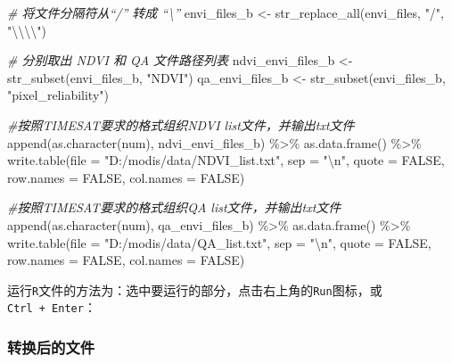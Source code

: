 \documentclass[
]{article}
\newenvironment{Shaded}{\begin{snugshade}}{\end{snugshade}}
\newcommand{\AttributeTok}[1]{\textcolor[rgb]{0.77,0.63,0.00}{#1}}
\newcommand{\CommentTok}[1]{\textcolor[rgb]{0.56,0.35,0.01}{\textit{#1}}}
\newcommand{\ConstantTok}[1]{\textcolor[rgb]{0.00,0.00,0.00}{#1}}
\newcommand{\FunctionTok}[1]{\textcolor[rgb]{0.00,0.00,0.00}{#1}}
\newcommand{\NormalTok}[1]{#1}
\newcommand{\OtherTok}[1]{\textcolor[rgb]{0.56,0.35,0.01}{#1}}
\newcommand{\SpecialCharTok}[1]{\textcolor[rgb]{0.00,0.00,0.00}{#1}}
\newcommand{\StringTok}[1]{\textcolor[rgb]{0.31,0.60,0.02}{#1}}
\begin{document}
\begin{Shaded}
\begin{Highlighting}[]
\CommentTok{\# 将文件分隔符从“/” 转成 “\textbackslash{}”}
\NormalTok{envi\_files\_b }\OtherTok{\textless{}{-}} \FunctionTok{str\_replace\_all}\NormalTok{(envi\_files, }\StringTok{"/"}\NormalTok{, }\StringTok{"}\SpecialCharTok{\textbackslash{}\textbackslash{}\textbackslash{}\textbackslash{}}\StringTok{"}\NormalTok{) }

\CommentTok{\# 分别取出 NDVI 和 QA 文件路径列表}
\NormalTok{ndvi\_envi\_files\_b }\OtherTok{\textless{}{-}} \FunctionTok{str\_subset}\NormalTok{(envi\_files\_b, }\StringTok{"NDVI"}\NormalTok{)}
\NormalTok{qa\_envi\_files\_b }\OtherTok{\textless{}{-}} \FunctionTok{str\_subset}\NormalTok{(envi\_files\_b, }\StringTok{"pixel\_reliability"}\NormalTok{)}

\CommentTok{\#按照TIMESAT要求的格式组织NDVI list文件，并输出txt文件}
\FunctionTok{append}\NormalTok{(}\FunctionTok{as.character}\NormalTok{(num), ndvi\_envi\_files\_b) }\SpecialCharTok{\%\textgreater{}\%} 
  \FunctionTok{as.data.frame}\NormalTok{() }\SpecialCharTok{\%\textgreater{}\%} 
  \FunctionTok{write.table}\NormalTok{(}\AttributeTok{file =} \StringTok{"D:/modis/data/NDVI\_list.txt"}\NormalTok{,}
            \AttributeTok{sep =} \StringTok{"}\SpecialCharTok{\textbackslash{}n}\StringTok{"}\NormalTok{, }\AttributeTok{quote =} \ConstantTok{FALSE}\NormalTok{, }
            \AttributeTok{row.names =} \ConstantTok{FALSE}\NormalTok{, }\AttributeTok{col.names =} \ConstantTok{FALSE}\NormalTok{)}

\CommentTok{\#按照TIMESAT要求的格式组织QA list文件，并输出txt文件}
\FunctionTok{append}\NormalTok{(}\FunctionTok{as.character}\NormalTok{(num), qa\_envi\_files\_b) }\SpecialCharTok{\%\textgreater{}\%} 
  \FunctionTok{as.data.frame}\NormalTok{() }\SpecialCharTok{\%\textgreater{}\%} 
  \FunctionTok{write.table}\NormalTok{(}\AttributeTok{file =} \StringTok{"D:/modis/data/QA\_list.txt"}\NormalTok{,}
              \AttributeTok{sep =} \StringTok{"}\SpecialCharTok{\textbackslash{}n}\StringTok{"}\NormalTok{, }\AttributeTok{quote =} \ConstantTok{FALSE}\NormalTok{, }
              \AttributeTok{row.names =} \ConstantTok{FALSE}\NormalTok{, }\AttributeTok{col.names =} \ConstantTok{FALSE}\NormalTok{)}
\end{Highlighting}
\end{Shaded}

运行\texttt{R}文件的方法为：选中要运行的部分，点击右上角的\texttt{Run}图标，或\texttt{Ctrl\ +\ Enter}：

\hypertarget{ux8f6cux6362ux540eux7684ux6587ux4ef6}{%
\subsubsection{转换后的文件}\label{ux8f6cux6362ux540eux7684ux6587ux4ef6}}
\end{document}
